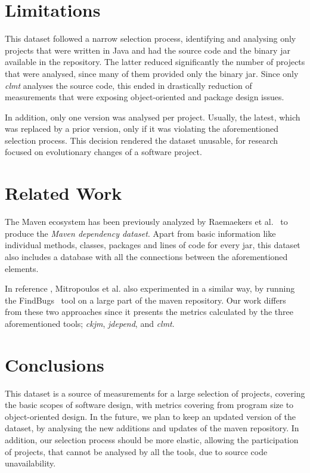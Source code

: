 \documentclass{sig-alternate}
\begin{document}
\section{Limitations}
\label{sec:limit}

This dataset followed a narrow selection process, identifying and analysing only projects that were written in Java and had the source code and the binary jar available in the repository. The latter reduced significantly the number of projects that were analysed, since many of them provided only the binary jar. Since only \textit{clmt} analyses the source code, this ended in drastically reduction of measurements that were exposing object-oriented and package design issues.

In addition, only one version was analysed per project. Usually, the latest, which was replaced by a prior version, only if it was violating the aforementioned selection process. This decision rendered the dataset unusable, for research focused on evolutionary changes of a software project.

\section{Related Work}
\label{sec:rel}

The Maven ecosystem has been previously analyzed by Raemaekers et al.~\cite{RDV13} to produce the {\it Maven dependency dataset}. Apart from basic information like individual methods, classes, packages and lines of code for every {\sc jar}, this dataset also includes a database with all the connections between the aforementioned elements.

In reference \cite{MKLGS14}, Mitropoulos et al. also experimented in a similar way, by running the FindBugs~\cite{HP04} tool on a large part of the maven repository. Our work differs from these two approaches since it presents the metrics calculated by the three aforementioned tools; \textit{ckjm}, \textit{jdepend}, and \textit{clmt}.

\section{Conclusions}
\label{sec:conc}

This dataset is a source of measurements for a large selection of projects, covering the basic scopes of software design, with metrics covering from program size to object-oriented design. In the future, we plan to keep an updated version of the dataset, by analysing the new additions and updates of the maven repository. In addition, our selection process should be more elastic, allowing the participation of projects, that cannot be analysed by all the tools, due to source code unavailability.
\end{document}
